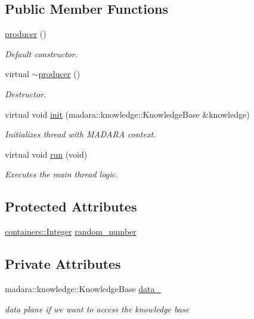 \subsection*{Public Member Functions}
\begin{DoxyCompactItemize}
\item 
\hyperlink{classthreads_1_1producer_a3863c51cfa32b07730d746f414546b37}{producer} ()
\begin{DoxyCompactList}\small\item\em Default constructor. \end{DoxyCompactList}\item 
virtual \hyperlink{classthreads_1_1producer_a2f807ac08bb0a2ad7912ff10cde3c44f}{$\sim$producer} ()
\begin{DoxyCompactList}\small\item\em Destructor. \end{DoxyCompactList}\item 
virtual void \hyperlink{classthreads_1_1producer_a1ec13d5979723407be381557c436fbbf}{init} (madara\+::knowledge\+::\+Knowledge\+Base \&knowledge)
\begin{DoxyCompactList}\small\item\em Initializes thread with M\+A\+D\+A\+RA context. \end{DoxyCompactList}\item 
virtual void \hyperlink{classthreads_1_1producer_aa060b439ac1979c44c8076b59cbe15f8}{run} (void)
\begin{DoxyCompactList}\small\item\em Executes the main thread logic. \end{DoxyCompactList}\end{DoxyCompactItemize}
\subsection*{Protected Attributes}
\begin{DoxyCompactItemize}
\item 
\hyperlink{controller_8cpp_a0584e2a15ee1231298f4501eca6bd1a0}{containers\+::\+Integer} \hyperlink{classthreads_1_1producer_a5ca9ba785a3f49123aea07f960e5497d}{random\+\_\+number}
\end{DoxyCompactItemize}
\subsection*{Private Attributes}
\begin{DoxyCompactItemize}
\item 
madara\+::knowledge\+::\+Knowledge\+Base \hyperlink{classthreads_1_1producer_a9cd75e08b351b2e4e13f3d5b3b4d9e67}{data\+\_\+}
\begin{DoxyCompactList}\small\item\em data plane if we want to access the knowledge base \end{DoxyCompactList}\end{DoxyCompactItemize}


